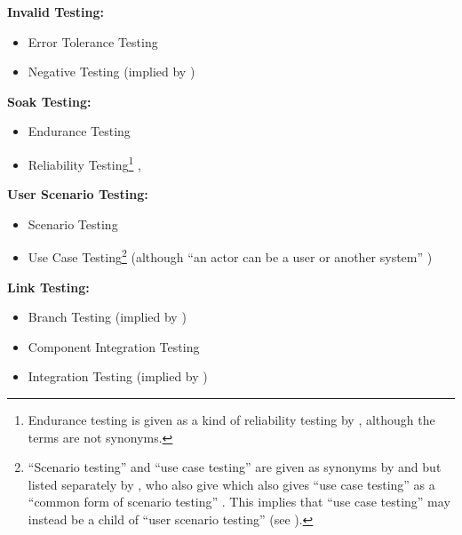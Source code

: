 \item \textbf{Invalid Testing:}
\begin{itemize}
    \item Error Tolerance Testing \cite[p.~45]{Kam2008}
    \item Negative Testing \cite{ISTQB} (implied by \cite[p.~10]{IEEE2021})
\end{itemize}
\item \textbf{Soak Testing:}
\begin{itemize}
    \item Endurance Testing \cite[p.~39]{IEEE2021}
    \item Reliability Testing\footnote{Endurance testing is given as a kind of
              reliability testing by \cite[p.~55]{Firesmith2015}, although the
              terms are not synonyms.} \cite[Tab.~1,~p.~26]{Gerrard2000b},
          \cite[Tab.~2]{Gerrard2000a}
\end{itemize}
\item \textbf{User Scenario Testing:}
\begin{itemize}
    \item Scenario Testing \cite{ISTQB}
    \item Use Case Testing\footnote{``Scenario testing'' and ``use case testing''
              are given as synonyms by \cite{ISTQB} and \cite[pp.~47-49]{Kam2008}
              but listed separately by \cite[p.~22]{IEEE2022}, \ifnotpaper who
                  also give \else which also gives \fi ``use case testing'' as a
              ``common form of scenario testing'' \cite[p.~20]{IEEE2021}.
              This implies that ``use case testing'' may instead be a child of
              ``user scenario testing'' (see ).}
          \cite[p.~48]{Kam2008} (although ``an actor can be a user or another
          system'' \cite[p.~20]{IEEE2021})
\end{itemize}
\item \textbf{Link Testing:}
\begin{itemize}
    \item Branch Testing (implied by \cite[p.~24]{IEEE2021})
    \item Component Integration Testing \cite[p.~45]{Kam2008}
    \item Integration Testing (implied by \cite[p.~13]{Gerrard2000a})
\end{itemize}